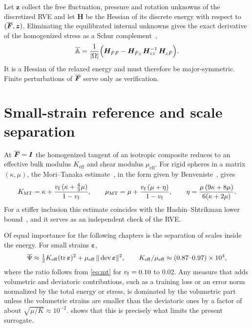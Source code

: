 Let $\bm z$ collect the free fluctuation, pressure and rotation unknowns of the
discretized RVE and let $\bm H$ be the Hessian of its discrete energy with
respect to $(\overline{\bm F},\bm z)$. Eliminating the equilibrated internal unknowns gives
the exact derivative of the homogenized stress as a Schur
complement~\cite{Miehe2002},
\begin{equation}
  \overline{\mathbb A}=\frac{1}{|\Omega|}\Bigl(\bm H_{\bar F\bar F}-\bm H_{\bar Fz}\,
  \bm H_{zz}^{-1}\,\bm H_{z\bar F}\Bigr).
  \label{eq:schur}
\end{equation}
It is a Hessian of the relaxed energy and must therefore be major-symmetric.
Finite perturbations of $\overline{\bm F}$ serve only as verification.

\section{Small-strain reference and scale separation}\label{sec:scales}

At $\overline{\bm F}=\bm I$ the homogenized tangent of an isotropic composite reduces to an
effective bulk modulus $K_{\mathrm{eff}}$ and shear modulus $\mu_{\mathrm{eff}}$.
For rigid spheres in a matrix $(\kappa,\mu)$, the Mori--Tanaka
estimate~\cite{MoriTanaka1973}, in the form given by Benveniste~\cite{Benveniste1987},
gives
\begin{equation}
  K_{\mathrm{MT}}=\kappa+\frac{v_{\mathrm f}\,(\kappa+\tfrac43\mu)}{1-v_{\mathrm f}},\qquad
  \mu_{\mathrm{MT}}=\mu+\frac{v_{\mathrm f}\,(\mu+\eta)}{1-v_{\mathrm f}},\qquad
  \eta=\frac{\mu\,(9\kappa+8\mu)}{6(\kappa+2\mu)} .
  \label{eq:mt}
\end{equation}
For a stiffer inclusion this estimate coincides with the Hashin--Shtrikman lower
bound~\cite{HashinShtrikman1963}, and it serves as an independent check of the RVE.

Of equal importance for the following chapters is the separation of scales
inside the energy. For small strains $\bm\varepsilon$,
\begin{equation}
  \overline{\Psi}\approx\tfrac12K_{\mathrm{eff}}(\operatorname{tr}\bm\varepsilon)^2
  +\mu_{\mathrm{eff}}\,\|\operatorname{dev}\bm\varepsilon\|^2,\qquad
  K_{\mathrm{eff}}/\mu_{\mathrm{eff}}\approx(0.87\text{--}0.97)\times10^4 ,
  \label{eq:split}
\end{equation}
where the ratio follows from \cref{eq:mt} for $v_{\mathrm f}=0.10$ to $0.02$.
Any measure that adds volumetric and deviatoric contributions, such as a
training loss or an error norm normalized by the total energy or stress, is
dominated by the volumetric part unless the volumetric strains are smaller than
the deviatoric ones by a factor of about $\sqrt{\mu/K}\approx10^{-2}$.
 shows that this is precisely what limits the present
surrogate.
